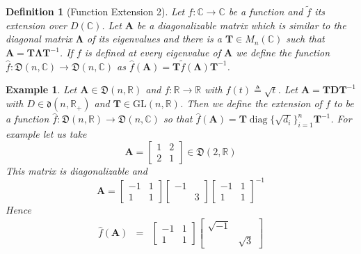 \documentclass[a4paper,10pt,oneside]{book}
\newtheorem{example}{Example}
\newtheorem{definition}{Definition}
\begin{document}
\begin{definition}[Function Extension 2]\label{def:extension}
 Let $f:\mathbb{C}\to\mathbb{C}$ be a function and $\tilde{f}$ its extension over $D(\mathbb{C})$. Let $\mathbf{A}$ be a diagonalizable matrix which is similar to the diagonal matrix $\mathbf{\Lambda}$ of its eigenvalues and there is a $\mathbf{T}\in M_n(\mathbb{C})$ such that $\mathbf{A}=\mathbf{T\Lambda T}^{-1}$. If $f$ is defined at every eigenvalue of $\mathbf{A}$ we define the function $\hat{f}:\mathfrak{D}(n,\mathbb{C})\to \mathfrak{D}(n,\mathbb{C})$ as $\hat{f}(\mathbf{A})=\mathbf{T}\tilde{f}(\mathbf{\Lambda})\mathbf{T}^{-1}$.
\end{definition}
\begin{example}
 Let $\mathbf{A}\in\mathfrak{D}(n,\mathbb{R})$ and $f:\mathbb{R}\to \mathbb{R}$ with $f(t)\triangleq\sqrt{t}$. Let $\mathbf{A}=\mathbf{TDT}^{-1}$ with $D\in\mathfrak{d}(n,\mathbb{R}_+)$ and $\mathbf{T}\in\text{GL}(n,\mathbb{R})$. Then we define the extension of $f$ to be a function $\hat{f}:\mathfrak{D}(n,\mathbb{R})\to \mathfrak{D}(n,\mathbb{C})$ so that $\hat{f}(\mathbf{A})=\mathbf{T}\operatorname{diag}\{\sqrt{d_i}\}_{i=1}^n\mathbf{T}^{-1}$. For example let us take
 \begin{equation}
  \mathbf{A}=\left[ {\begin{array}{cc} 
                      1 & 2 \\ 2 & 1
                     \end{array} } \right] \in \mathfrak{D}(2,\mathbb{R})
 \end{equation}
 This matrix is diagonalizable and
\begin{equation}
\mathbf{A}= \left[ {\begin{array}{cc} -1 & 1 \\ 1 & 1 \end{array} } \right]
\left[ {\begin{array}{cc} -1  \\  & 3 \end{array} } \right]
\left[ {\begin{array}{cc} -1 & 1 \\ 1 & 1 \end{array} } \right]^{-1}
\end{equation}
Hence
\begin{eqnarray}
\hat{f}(\mathbf{A}) &=& \left[ {\begin{array}{cc} -1 & 1 \\ 1 & 1 \end{array} } \right]
\left[ {\begin{array}{cc} \sqrt{-1}  \\  & \sqrt{3} \end{array} } \right]

\end{eqnarray}
\end{example}
\end{document}
